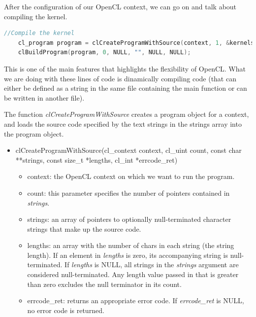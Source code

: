 \documentclass[titlepage]{article}
\begin{document}
After the configuration of our OpenCL context, we can go on and talk about compiling the kernel.

\begin{minipage}{\linewidth}
\begin{lstlisting}[language=C, style=customc, breaklines=true]
    //Compile the kernel
    cl_program program = clCreateProgramWithSource(context, 1, &kernelstring, NULL, NULL);
    clBuildProgram(program, 0, NULL, "", NULL, NULL);
\end{lstlisting}
\end{minipage}

This is one of the main features that highlights the flexibility of OpenCL. What we are doing with these lines of code is dinamically compiling code (that can either be defined as a string in the same file containing the main function or can be written in another file).

The function \textit{clCreateProgramWithSource} creates a program object for a context, and loads the source code specified by the text strings in the strings array into the program object. 

\begin{itemize}
    \item clCreateProgramWithSource(cl\_context context, cl\_uint count, const char **strings, const size\_t *lengths, cl\_int *errcode\_ret)
    \begin{itemize}
        \item context: the OpenCL context on which we want to run the program.
        \item count: this parameter specifies the number of pointers contained in \textit{strings}.
        \item strings: an array of pointers to optionally null-terminated character strings that make up the source code.
        \item  lengths: an array with the number of chars in each string (the string length). If an element in \textit{lengths} is zero, its accompanying string is null-terminated. If \textit{lengths} is NULL, all strings in the \textit{strings} argument are considered null-terminated. Any length value passed in that is greater than zero excludes the null terminator in its count.
        \item errcode\_ret: returns an appropriate error code. If \textit{errcode\_ret} is NULL, no error code is returned.
    \end{itemize}
\end{itemize}
\end{document}
